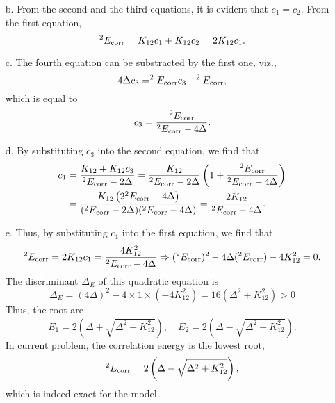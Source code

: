 \documentclass[a4paper]{book}
\newcommand{\corr}{{\rm corr}}
\begin{document}
\begin{solution}
\begin{itemize}
	\item[b.] From the second and the third equations, it is evident that $c_1 = c_2$. From the first equation,
	\begin{equation}
		^2 E_\corr = K_{12} c_1 + K_{12} c_2 = 2 K_{12} c_1.
	\end{equation}
		
	\item[c.] The fourth equation can be substracted by the first one, viz.,
	\[
		4\Delta c_3 = ^2 E_\corr c_3 - ^2 E_\corr,
	\]
	which is equal to
	\begin{equation}
		c_3 = \frac{ ^2 E_\corr }{ ^2 E_\corr - 4 \Delta }.
	\end{equation}
	
	\item[d.] By substituting $c_3$ into the second equation, we find that
	\begin{align*}
		c_1 &= \frac{ K_{12} + K_{12} c_3 }{  ^2 E_\corr - 2\Delta } =  \frac{ K_{12} }{ ^2 E_\corr - 2\Delta } \left( 1 + \frac{ ^2 E_\corr }{ ^2 E_\corr - 4 \Delta } \right) \notag \\
		&= \frac{ K_{12}  \left( 2 ^2 E_\corr - 4 \Delta \right) }{ ( ^2 E_\corr - 2\Delta )( ^2 E_\corr - 4 \Delta ) } = \frac{ 2K_{12} }{ ^2 E_\corr - 4 \Delta }.
	\end{align*}
	
	\item[e.] Thus, by substituting $c_1$ into the first equation, we find that
	\[
		^2 E_\corr = 2 K_{12} c_1 = \frac{ 4K^2_{12} }{ ^2 E_\corr - 4 \Delta } \Rightarrow ( ^2 E_\corr )^2 - 4 \Delta ( ^2 E_\corr ) - 4 K^2_{12} = 0.
	\]
	The discriminant $\Delta_E$ of this quadratic equation is
	\[
		\Delta_E = ( 4 \Delta )^2 - 4 \times 1 \times ( -4 K^2_{12} ) = 16( \Delta^2 + K^2_{12} ) > 0
	\]	
	Thus, the root are
	\[
		E_1 = 2\left( \Delta + \sqrt{ \Delta^2 + K^2_{12} } \right), \quad E_2 = 2 \left( \Delta - \sqrt{ \Delta^2 + K^2_{12} } \right).
	\]
	In current problem, the correlation energy is the lowest root,
	\begin{equation}
		^2 E_\corr = 2 \left( \Delta - \sqrt{ \Delta^2 + K^2_{12} } \right),
	\end{equation}
	which is indeed exact for the model.
	\end{itemize}		
	
	\end{solution}
	
\end{document}
